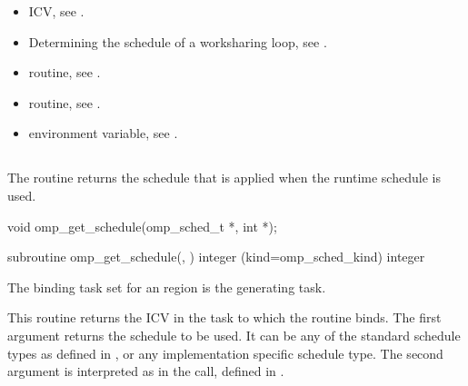 \crossreferences
\begin{itemize}
\item {} ICV, see
.

\item Determining the schedule of a worksharing loop, see
.

\item {} routine, see
.

\item {} routine, see
.

\item {} environment variable, see
.
\end{itemize}









\subsection{}
\label{subsec:omp_get_schedule}
\summary
The  routine returns the schedule that is applied when the
runtime schedule is used.
\format
\begin{ccppspecific}
\begin{ompcFunction}
void omp_get_schedule(omp_sched_t *, int *);
\end{ompcFunction}
\end{ccppspecific}


\begin{fortranspecific}
\begin{ompfSubroutine}
subroutine omp_get_schedule(, )
integer (kind=omp_sched_kind) 
integer 
\end{ompfSubroutine}
\end{fortranspecific}

\binding
The binding task set for an  region is the generating task.

\effect
This routine returns the  ICV in the task to which the routine binds. The
first argument  returns the schedule to be used. It can be any of the standard
schedule types as defined in
,
or any implementation specific
schedule type. The second argument is interpreted as in the  call,
defined in
.

